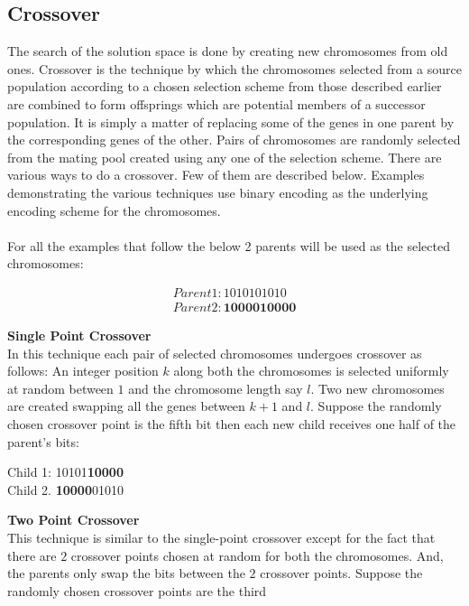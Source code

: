 \documentclass[a4paper, 12pt]{article}
\begin{document}
\subsection{Crossover}
The search of the solution space is done by creating new chromosomes from old ones. Crossover is the technique by which the chromosomes 
selected from a source population according to a chosen selection scheme from those described earlier are combined to form offsprings which are potential members of a successor population. It is simply a matter of replacing some of the genes in one parent by the corresponding genes of the other. Pairs of chromosomes are randomly selected from the mating pool created using any one of the selection scheme. There are various ways to do a crossover. Few of them are described below. Examples demonstrating the various techniques use binary encoding as the underlying encoding scheme for the chromosomes.\\~\\
For all the examples that follow the below 2 parents will be used as the selected chromosomes:
\begin{center}
\begin{align*}
Parent 1: 1010101010\\
Parent 2: \textbf{1000010000}
\end{align*}
\end{center}
\textbf{Single Point Crossover}\\
In this technique each pair of selected chromosomes undergoes crossover as follows: An integer position $k$ along both the chromosomes is 
selected uniformly at random between $1$ and the chromosome length say $l$. Two new chromosomes are created swapping all the genes between $k+1$ and $l$. Suppose the randomly chosen crossover point is the fifth bit then each new child receives one half of the parent's bits:
\begin{center}
Child 1: 10101\textbf{10000}\\
Child 2. \textbf{10000}01010
\end{center}
\textbf{Two Point Crossover}\\
This technique is similar to the single-point crossover except for the fact that there are $2$ crossover points chosen at random for both the
chromosomes. And, the parents only swap the bits between the $2$ crossover points. Suppose the randomly chosen crossover points are the third 
\end{document}
